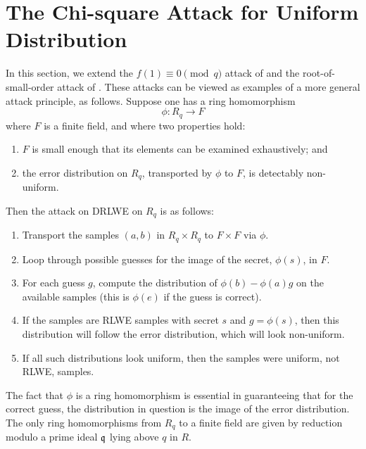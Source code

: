 \documentclass[envcountsect]{llncs}
\begin{document}
\section{The Chi-square Attack for Uniform Distribution}
\label{sec: chi-square}

In this section, we extend the $f(1) \equiv 0 \pmod q$ attack of \cite{eisentrager2014weak} and the root-of-small-order attack of \cite{elos2015weak}.  These attacks can be viewed as examples of a more general attack principle, as follows.  Suppose one has a ring homomorphism
\[
        \phi: R_q \rightarrow F 
\]
where $F$ is a finite field, and where two properties hold:
\begin{enumerate}
        \item $F$ is small enough that its elements can be examined exhaustively; and
        \item the error distribution on $R_q$, transported by $\phi$ to $F$, is detectably non-uniform.
\end{enumerate}

Then the attack on DRLWE on $R_q$ is as follows:
\begin{enumerate}
        \item Transport the samples $(a, b)$ in $R_q \times R_q$ to $F \times F$ via $\phi$.
        \item Loop through possible guesses for the image of the secret, $\phi(s)$, in $F$.
        \item For each guess $g$, compute the distribution of $\phi(b) - \phi(a)g$ on the available samples (this is $\phi(e)$ if the guess is correct).
        \item If the samples are RLWE samples with secret $s$ and $g = \phi(s)$, then this distribution will follow the error distribution, which will look non-uniform.
        \item If all such distributions look uniform, then the samples were uniform, not RLWE, samples.
\end{enumerate}

The fact that $\phi$ is a ring homomorphism is essential in guaranteeing that for the correct guess, the distribution in question is the image of the error distribution.  The only ring homomorphisms from $R_q$ to a finite field are given by reduction modulo a prime ideal $\mathfrak{q}$ lying above $q$ in $R$.
\end{document}
